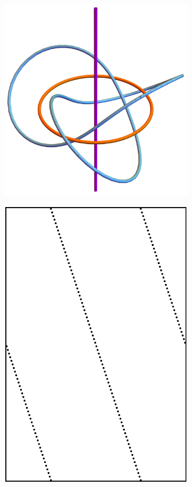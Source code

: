 \documentclass[12pt,twoside]{reedthesis}
\theoremstyle{definition}
\begin{document}
\begin{figure}[t]
  \centering
  \begin{subfigure}[c]{0.32\textwidth}
    \centering
    \includegraphics[width=0.9\textwidth]{figures/s3_wo_k_gens.png}
  \end{subfigure}
  \hfill
  \begin{subfigure}[c]{0.32\textwidth}
    \centering
    \includegraphics[width=0.9\textwidth]{figures/antipodal_subset_path_1.pdf}

\end{subfigure}
\end{figure}
\end{document}
